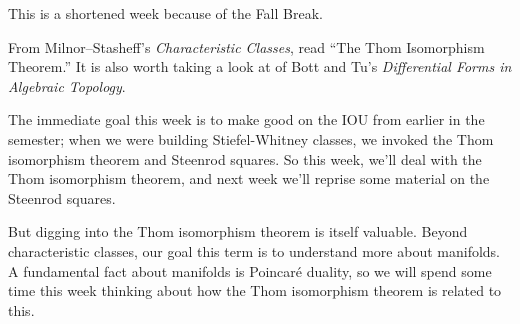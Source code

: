 \documentclass{homework}
\author{Jim Fowler}
\date{Week 8: Thom isomorphism}
\begin{document}
\maketitle

This is a shortened week because of the Fall Break.

From Milnor--Stasheff's \textit{Characteristic Classes}, read ``The
Thom Isomorphism Theorem.''  It is also worth taking a look at
 of Bott and Tu's \textit{Differential Forms in
  Algebraic Topology}.

The immediate goal this week is to make good on the IOU from earlier
in the semester; when we were building Stiefel-Whitney classes, we
invoked the Thom isomorphism theorem and Steenrod squares.  So this
week, we'll deal with the Thom isomorphism theorem, and next week
we'll reprise some material on the Steenrod squares.

But digging into the Thom isomorphism theorem is itself valuable.
Beyond characteristic classes, our goal this term is to understand
more about manifolds.  A fundamental fact about manifolds is
Poincar\'e duality, so we will spend some time this week thinking
about how the Thom isomorphism theorem is related to this.
\end{document}
